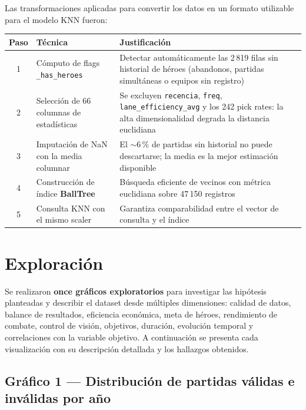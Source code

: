 \documentclass[12pt,a4paper]{article}
\begin{document}
Las transformaciones aplicadas para convertir los datos en un formato utilizable
para el modelo KNN fueron:

\begin{table}[h!]
\centering
\renewcommand{\arraystretch}{1.3}
\begin{tabular}{@{}c p{4.5cm} p{7cm}@{}}
  \toprule
  \textbf{Paso} & \textbf{T\'ecnica} & \textbf{Justificaci\'on} \\
  \midrule
  1 & C\'omputo de flags \texttt{\_has\_heroes}
    & Detectar autom\'aticamente las 2\,819 filas sin historial de h\'eroes
      (abandonos, partidas simult\'aneas o equipos sin registro) \\
  2 & Selecci\'on de 66 columnas de estad\'isticas
    & Se excluyen \texttt{recencia}, \texttt{freq}, \texttt{lane\_efficiency\_avg}
      y los 242 pick rates: la alta dimensionalidad degrada la distancia euclidiana \\
  3 & Imputaci\'on de NaN con la media columnar
    & El $\sim$6\,\% de partidas sin historial no puede descartarse;
      la media es la mejor estimaci\'on disponible \\
  4 & Construcci\'on de \'indice \textbf{BallTree}
    & B\'usqueda eficiente de vecinos con m\'etrica euclidiana sobre 47\,150 registros \\
  5 & Consulta KNN con el mismo scaler
    & Garantiza comparabilidad entre el vector de consulta y el \'indice \\
  \bottomrule
\end{tabular}
\end{table}

\section{Exploración}
 
Se realizaron \textbf{once gráficos exploratorios} para investigar las hipótesis
planteadas y describir el dataset desde múltiples dimensiones: calidad de datos,
balance de resultados, eficiencia económica, meta de héroes, rendimiento de
combate, control de visión, objetivos, duración, evolución temporal y
correlaciones con la variable objetivo. A continuación se presenta cada
visualización con su descripción detallada y los hallazgos obtenidos.
 
\subsection{Gráfico 1 --- Distribución de partidas válidas e inválidas por año}
 
\end{document}
